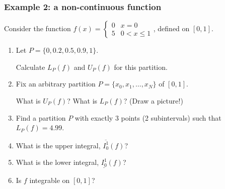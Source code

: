\documentclass[14pt]{beamer}
\begin{document}
\begin{frame}[t]
	\fontsize{13}{13}\selectfont
	\frametitle{Example 2: a non-continuous function}

	Consider the function \; $\displaystyle f(x) =
	\begin{cases}
		0 & x = 0        \\
		5 & 0 < x \leq 1
	\end{cases}$, \;defined on $[0,1]$.

	\begin{enumerate}
		\item Let $\displaystyle P = \{0, 0.2, 0.5, 0.9, 1 \}$.
			\vspace{.1cm}

			Calculate $\displaystyle L_{P}(f)$ and $\displaystyle U_{P}(f)$ for this partition.
			\vspace{.1cm}

		\item Fix an arbitrary partition $P = \{x_{0}, x_{1}, \dots, x_{N}\}$ of $[0,
			1]$. \\
			\vspace{.1cm}

			What is $U_{P}(f)$? What is $\displaystyle L_{P}(f)$? (Draw a picture!)
			\vspace{.1cm}

		\item Find a partition $P$ with exactly 3 points (2 subintervals) such that $\displaystyle
			L_{P}(f) = 4.99$.

		\item What is the upper integral, $\overline{I_0^1}(f)$?

		\item What is the lower integral, $\underline{I_0^1}(f)$?

		\item Is $f$ integrable on $[0,1]$?
	\end{enumerate}
\end{frame}
\end{document}
